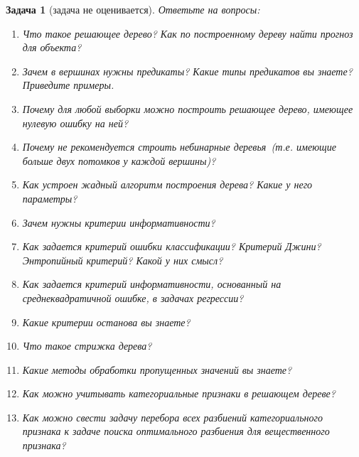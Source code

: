 \documentclass[12pt,fleqn]{article}
\newtheorem{esProblem}{Задача}
\begin{document}
\begin{esProblem}[задача не оценивается]
    Ответьте на вопросы:
    \begin{enumerate}
        \item Что такое решающее дерево? Как по построенному дереву найти прогноз для объекта?
        \item Зачем в вершинах нужны предикаты? Какие типы предикатов вы знаете? Приведите примеры.
        \item Почему для любой выборки можно построить решающее дерево, имеющее нулевую ошибку на ней?
        \item Почему не рекомендуется строить небинарные деревья~(т.е. имеющие больше двух потомков у каждой вершины)?
        \item Как устроен жадный алгоритм построения дерева? Какие у него параметры?
        \item Зачем нужны критерии информативности?
        \item Как задается критерий ошибки классификации? Критерий Джини? Энтропийный критерий? Какой у них смысл?
        \item Как задается критерий информативности, основанный на среднеквадратичной ошибке, в задачах регрессии?
        \item Какие критерии останова вы знаете?
        \item Что такое стрижка дерева?
        \item Какие методы обработки пропущенных значений вы знаете?
        \item Как можно учитывать категориальные признаки в решающем дереве?
        \item Как можно свести задачу перебора всех разбиений категориального признака
            к задаче поиска оптимального разбиения для вещественного признака?
    \end{enumerate}
\end{esProblem}
\end{document}
